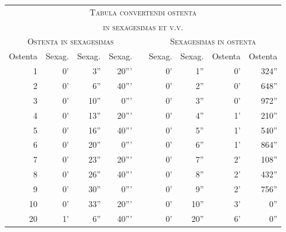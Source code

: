 %
\normalsize
\centering
\setlength{\tabcolsep}{3pt}
\renewcommand{\arraystretch}{1.1}
\newcommand{\colhead}[1]{\multicolumn{1}{c}{\footnotesize #1}}
%
\begin{tabular}{@{} r r r r  c r r r r }
\toprule
  \multicolumn{9}{c}{\Large\scshape Tabula convertendi ostenta} \\
  \multicolumn{9}{c}{\Large\scshape in sexagesimas et v.v.} \\
\toprule
  \multicolumn{4}{c}{\normalsize\scshape Ostenta in sexagesimas} & &
  \multicolumn{4}{c}{\normalsize\scshape Sexagesimas in ostenta}
\\
\cmidrule[\heavyrulewidth]{1-4} \cmidrule[\heavyrulewidth]{6-9}
\colhead{Ostenta} &
\colhead{Sexag.} &
\colhead{Sexag.} &
\colhead{Sexag.} &
\hspace{8mm} &
\colhead{Sexag.} &
\colhead{Sexag.} &
\colhead{Ostenta} &
\colhead{Ostenta}
\\
\cmidrule{1-4} \cmidrule{6-9}
   1 &  0' &  3'' & 20''' & &  0' &  1'' &    0' & 324'' \\
   2 &  0' &  6'' & 40''' & &  0' &  2'' &    0' & 648'' \\
   3 &  0' & 10'' &  0''' & &  0' &  3'' &    0' & 972'' \\
   4 &  0' & 13'' & 20''' & &  0' &  4'' &    1' & 210'' \\
   5 &  0' & 16'' & 40''' & &  0' &  5'' &    1' & 540'' \\
   6 &  0' & 20'' &  0''' & &  0' &  6'' &    1' & 864'' \\
   7 &  0' & 23'' & 20''' & &  0' &  7'' &    2' & 108'' \\
   8 &  0' & 26'' & 40''' & &  0' &  8'' &    2' & 432'' \\
   9 &  0' & 30'' &  0''' & &  0' &  9'' &    2' & 756'' \\
  10 &  0' & 33'' & 20''' & &  0' & 10'' &    3' &   0'' \\
  20 &  1' &  6'' & 40''' & &  0' & 20'' &    6' &   0'' \\

\end{tabular}
